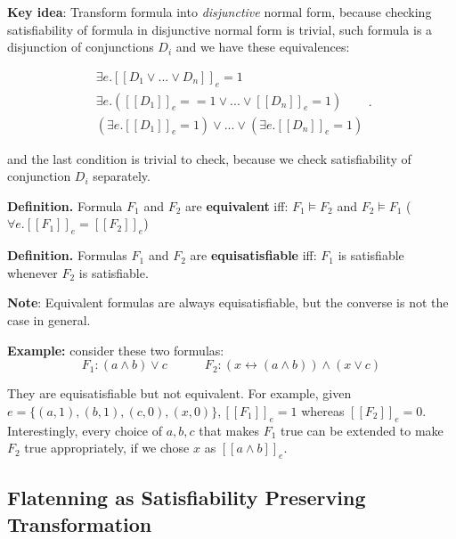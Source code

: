 \documentclass[11pt]{article}
\begin{document}
\textbf{Key idea}: Transform formula into \textit{disjunctive} normal form, because checking satisfiability of formula in disjunctive normal form is trivial, such formula is a disjunction of conjunctions $D_i$ and we have these equivalences: 

\[
	\begin{gathered}
		\exists e. [\![D_1 \lor ... \lor D_n]\!]_e = 1 \\
		\exists e.([\![D_1]\!]_e == 1 \lor ... \lor [\![D_n]\!]_e = 1) \\
		 (\exists e. [\![D_1]\!]_e = 1) \lor  ... \lor (\exists e. [\![D_n]\!]_e = 1)
	\end{gathered}
.\] 

and the last condition is trivial to check, because we check satisfiability of conjunction $D_i$ separately. 

\begin{tcolorbox}[
    enhanced,
    frame hidden,
    borderline west={2pt}{0pt}{black},
    boxsep=5pt,
    left=8pt
]
\textbf{Definition.} Formula $F_1$ and $F_2$ are \textbf{equivalent} iff: $F_1 \models F_2$ and $F_2 \models F_1$ ($\forall e. [\![F_1]\!]_e = [\![F_2]\!]_e$) 
\end{tcolorbox}

\begin{tcolorbox}[
    enhanced,
    frame hidden,
    borderline west={2pt}{0pt}{black},
    boxsep=5pt,
    left=8pt
]
\textbf{Definition.} Formulas $F_1$ and $F_2$ are \textbf{equisatisfiable} iff: $F_1$ is satisfiable whenever $F_2$ is satisfiable. 
\end{tcolorbox}

\textbf{Note}: Equivalent formulas are always equisatisfiable, but the converse is not the case in general. 

\textbf{Example:} consider these two formulas: $$F_1: (a \land b) \lor c \quad \quad \quad F_2: (x \leftrightarrow (a \land b)) \land (x \lor c)$$

They are equisatisfiable but not equivalent. For example, given $e = \{(a, 1), (b, 1), (c, 0), (x, 0)\}, [\![F_1]\!]_e = 1$ whereas $[\![F_2]\!]_e = 0$. Interestingly, every choice of $a, b, c$ that makes $F_1$ true can be extended to make $F_2$ true appropriately, if we chose $x$ as $[\![a \land b]\!]_e$. 

\subsection*{Flatenning as Satisfiability Preserving Transformation}
\end{document}
